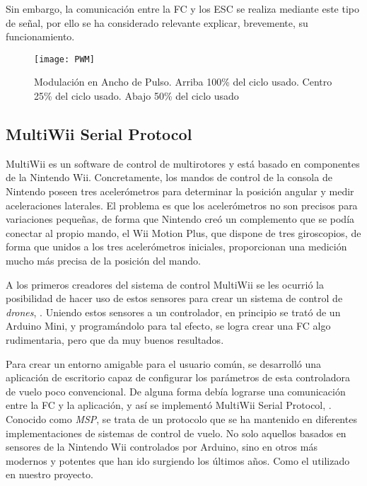 Sin embargo, la comunicación entre la FC y los ESC se realiza mediante este tipo de señal, por ello se ha considerado relevante explicar, brevemente, su funcionamiento.
\begin{figure}[H]
	\centering
	\texttt{[image: PWM]}
	\caption[PWM. Modulación en Ancho de Pulso.]{Modulación en Ancho de Pulso. Arriba 100\% del ciclo usado. Centro 25\% del ciclo usado. Abajo 50\% del ciclo usado}\label{fig:PWM}
\end{figure}


\subsection{MultiWii Serial Protocol}
\label{subsec:MSP}

MultiWii es un software de control de multirotores y está basado en componentes de la Nintendo Wii. Concretamente, los mandos de control de la consola de Nintendo poseen tres acelerómetros para determinar la posición angular y medir aceleraciones laterales. El problema es que los acelerómetros no son precisos para variaciones pequeñas, de forma que Nintendo creó un complemento que se podía conectar al propio mando, el Wii Motion Plus, que dispone de tres giroscopios, de forma que unidos a los tres acelerómetros iniciales, proporcionan una medición mucho más precisa de la posición del mando.

A los primeros creadores del sistema de control MultiWii se les ocurrió la posibilidad de hacer uso de estos sensores para crear un sistema de control de \emph{drones}, \citep{wiki:MultiWiiHistory}. Uniendo estos sensores a un controlador, en principio se trató de un Arduino Mini, y programándolo para tal efecto, se logra crear una FC algo rudimentaria, pero que da muy buenos resultados.

Para crear un entorno amigable para el usuario común, se desarrolló una aplicación de escritorio capaz de configurar los parámetros de esta controladora de vuelo poco convencional. De alguna forma debía lograrse una comunicación entre la FC y la aplicación, y así se implementó MultiWii Serial Protocol, \citep{wiki:MSPDefinition}.\\Conocido como \textit{MSP}, se trata de un protocolo que se ha mantenido en diferentes implementaciones de sistemas de control de vuelo. No solo aquellos basados en sensores de la Nintendo Wii controlados por Arduino, sino en otros más modernos y potentes que han ido surgiendo los últimos años. Como el utilizado en nuestro proyecto.

